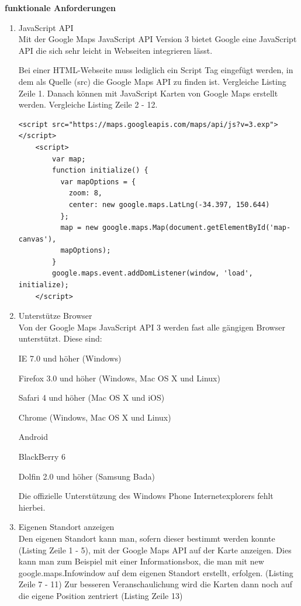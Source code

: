 \textbf{funktionale Anforderungen}
\begin{enumerate}
\item JavaScript API\\
Mit der Google Maps JavaScript API Version 3 bietet Google eine JavaScript API die sich sehr leicht in Webseiten integrieren lässt. 

Bei einer HTML-Webseite muss lediglich ein Script Tag eingefügt werden, in dem als Quelle (src) die Google Maps API zu finden ist. Vergleiche Listing Zeile 1. Danach können mit JavaScript Karten von Google Maps erstellt werden. Vergleiche Listing Zeile 2 - 12.
\begin{lstlisting}
<script src="https://maps.googleapis.com/maps/api/js?v=3.exp"></script>
    <script>
		var map;
		function initialize() {
		  var mapOptions = {
		    zoom: 8,
		    center: new google.maps.LatLng(-34.397, 150.644)
		  };
		  map = new google.maps.Map(document.getElementById('map-canvas'),
	      mapOptions);
		}
		google.maps.event.addDomListener(window, 'load', initialize);
    </script>
\end{lstlisting} \cite[Codebeispiel Simple Map]{googlemaps}


\item Unterstütze Browser\\
Von der Google Maps JavaScript API 3 werden fast alle gängigen Browser unterstützt. Diese sind:

\glqq 
    IE 7.0 und höher (Windows)
    
    Firefox 3.0 und höher (Windows, Mac OS X und Linux)
    
    Safari 4 und höher (Mac OS X und iOS)
    
    Chrome (Windows, Mac OS X und Linux)
    
    Android
    
    BlackBerry 6
    
    Dolfin 2.0 und höher (Samsung Bada)
\grqq \cite{googlemaps}

Die offizielle Unterstützung des Windows Phone Internetexplorers fehlt hierbei.

\item Eigenen Standort anzeigen\\
Den eigenen Standort kann man, sofern dieser bestimmt werden konnte (Listing Zeile 1 - 5), mit der Google Maps API auf der Karte anzeigen. Dies kann man zum Beispiel mit einer Informationsbox, die man mit \glqq new google.maps.Infowindow \grqq auf dem eigenen Standort erstellt, erfolgen. (Listing Zeile 7 - 11) Zur besseren Veranschaulichung wird die Karten dann noch auf die eigene Position zentriert (Listing Zeile 13)


\end{enumerate}
